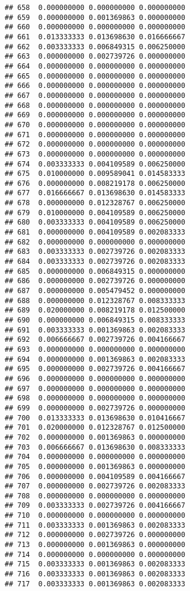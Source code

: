 \documentclass[
]{article}
\begin{document}
\begin{verbatim}
## 658  0.000000000 0.000000000 0.000000000
## 659  0.000000000 0.001369863 0.000000000
## 660  0.000000000 0.000000000 0.000000000
## 661  0.013333333 0.013698630 0.016666667
## 662  0.003333333 0.006849315 0.006250000
## 663  0.000000000 0.002739726 0.000000000
## 664  0.000000000 0.000000000 0.000000000
## 665  0.000000000 0.000000000 0.000000000
## 666  0.000000000 0.000000000 0.000000000
## 667  0.000000000 0.000000000 0.000000000
## 668  0.000000000 0.000000000 0.000000000
## 669  0.000000000 0.000000000 0.000000000
## 670  0.000000000 0.000000000 0.000000000
## 671  0.000000000 0.000000000 0.000000000
## 672  0.000000000 0.000000000 0.000000000
## 673  0.000000000 0.000000000 0.000000000
## 674  0.003333333 0.004109589 0.006250000
## 675  0.010000000 0.009589041 0.014583333
## 676  0.000000000 0.008219178 0.006250000
## 677  0.016666667 0.013698630 0.014583333
## 678  0.000000000 0.012328767 0.006250000
## 679  0.010000000 0.004109589 0.006250000
## 680  0.003333333 0.004109589 0.006250000
## 681  0.000000000 0.004109589 0.002083333
## 682  0.000000000 0.000000000 0.000000000
## 683  0.003333333 0.002739726 0.002083333
## 684  0.003333333 0.002739726 0.002083333
## 685  0.000000000 0.006849315 0.000000000
## 686  0.000000000 0.002739726 0.000000000
## 687  0.000000000 0.005479452 0.000000000
## 688  0.000000000 0.012328767 0.008333333
## 689  0.020000000 0.008219178 0.012500000
## 690  0.000000000 0.006849315 0.008333333
## 691  0.003333333 0.001369863 0.002083333
## 692  0.006666667 0.002739726 0.004166667
## 693  0.000000000 0.000000000 0.000000000
## 694  0.000000000 0.001369863 0.002083333
## 695  0.000000000 0.002739726 0.004166667
## 696  0.000000000 0.000000000 0.000000000
## 697  0.000000000 0.000000000 0.000000000
## 698  0.000000000 0.000000000 0.000000000
## 699  0.000000000 0.002739726 0.000000000
## 700  0.013333333 0.013698630 0.010416667
## 701  0.020000000 0.012328767 0.012500000
## 702  0.000000000 0.001369863 0.000000000
## 703  0.006666667 0.013698630 0.008333333
## 704  0.000000000 0.000000000 0.000000000
## 705  0.000000000 0.001369863 0.000000000
## 706  0.000000000 0.004109589 0.004166667
## 707  0.000000000 0.002739726 0.002083333
## 708  0.000000000 0.000000000 0.000000000
## 709  0.003333333 0.002739726 0.004166667
## 710  0.000000000 0.000000000 0.000000000
## 711  0.003333333 0.001369863 0.002083333
## 712  0.000000000 0.002739726 0.000000000
## 713  0.000000000 0.001369863 0.000000000
## 714  0.000000000 0.000000000 0.000000000
## 715  0.003333333 0.001369863 0.002083333
## 716  0.003333333 0.001369863 0.002083333
## 717  0.003333333 0.001369863 0.002083333

\end{verbatim}
\end{document}
